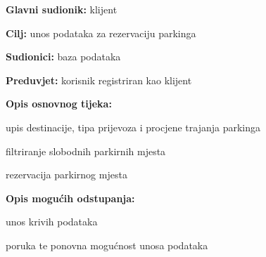     				\noindent {}
    				\begin{packed_item}
    					
    					\item \textbf{Glavni sudionik: } klijent
    					\item  \textbf{Cilj:} unos podataka za rezervaciju parkinga
    					\item  \textbf{Sudionici:} baza podataka
    					\item  \textbf{Preduvjet:} korisnik registriran kao klijent
    					\item  \textbf{Opis osnovnog tijeka:}
    					
    					\item[] \begin{packed_enum}
    						
    						\item upis destinacije, tipa prijevoza i procjene trajanja parkinga
    						\item filtriranje slobodnih parkirnih mjesta
    						\item rezervacija parkirnog mjesta

    					\end{packed_enum}
    					
    					\item  \textbf{Opis mogućih odstupanja:}
    					
    					\item[] \begin{packed_item}
    						
    						\item[2.a] unos krivih podataka
    						\item[] \begin{packed_enum}
    							
    							\item poruka te ponovna mogućnost unosa podataka
    					
    						\end{packed_enum}
    						
    					\end{packed_item}
    				\end{packed_item}
    				\noindent {}
